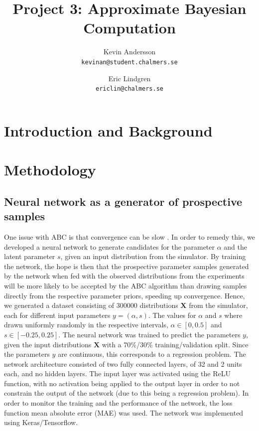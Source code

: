 \documentclass[11pt,a4paper]{article}
\title{Project 3: Approximate Bayesian Computation}
\author{
  Kevin Andersson\\
  \texttt{kevinan@student.chalmers.se}
  \and
   Eric Lindgren\\
  \texttt{ericlin@chalmers.se}
}
\begin{document}
\maketitle

{}%
\setcounter{page}{1}
\section{Introduction and Background}



\section{Methodology}


\subsection[Task 1]{Neural network as a generator of prospective samples}
\label{sec:method_NN}
One issue with ABC is that convergence can be slow \cite{rasmusbaath}. In order to remedy this, we developed a neural network to generate candidates for the parameter $\alpha$ and the latent parameter $s$, given an input distribution from the simulator. By training the network, the hope is then that the prospective parameter samples generated by the network when fed with the observed distributions from the experiments will be more likely to be accepted by the ABC algorithm than drawing samples directly from the respective parameter priors, speeding up convergence. Hence, we generated a dataset consisting of 300000 distributions $\mathbf{X}$ from the simulator, each for different input parameters $y = (\alpha, s)$. The values for $\alpha$ and $s$ where drawn uniformly randomly in the respective intervals, $\alpha\in[0, 0.5]$ and $s\in[-0.25, 0.25]$. The neural network was trained to predict the parameters $y$, given the input distributions $\mathbf{X}$ with a 70\%/30\% training/validation split. Since the parameters $y$ are continuous, this corresponds to a regression problem. The network architecture consisted of two fully connected layers, of 32 and 2 units each, and no hidden layers. The input layer was activated using the ReLU function, with no activation being applied to the output layer in order to not constrain the output of the network (due to this being a regression problem). In order to monitor the training and the performance of the network, the loss function mean absolute error (MAE) was used. The network was implemented using Keras/Tensorflow.
\end{document}
